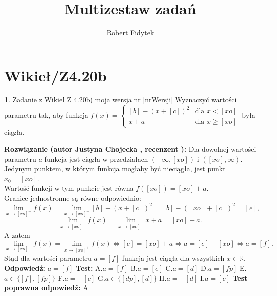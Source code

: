 \documentclass[12pt, a4paper]{article}
\title{Multizestaw zadań}
\author{Robert Fidytek}
\date{}
\theoremstyle{definition} %
\newtheorem{zad}{}
\newcommand{\kategoria}[1]{\section{#1}} %
\newcommand{\zadStart}[1]{\begin{zad}#1\newline} %
\newcommand{\zadStop}{\end{zad}}   %
\newcommand{\rozwStart}[2]{\noindent \textbf{Rozwiązanie (autor #1 , recenzent #2): }\newline} %
\newcommand{\rozwStop}{\newline}                                            %
\newcommand{\odpStart}{\noindent \textbf{Odpowiedź:}\newline}    %
\newcommand{\odpStop}{\newline}                                             %
\newcommand{\testStart}{\noindent \textbf{Test:}\newline} %
\newcommand{\testStop}{\newline} %
\newcommand{\kluczStart}{\noindent \textbf{Test poprawna odpowiedź:}\newline} %
\newcommand{\kluczStop}{\newline} %
\begin{document}
\maketitle


\kategoria{Wikieł/Z4.20b}
\zadStart{Zadanie z Wikieł Z 4.20b) moja wersja nr [nrWersji]}
Wyznaczyć wartości parametru tak, aby funkcja $
f(x) = \left\{ \begin{array}{ll}
[b]-(x+[c])^{2} & \textrm{dla $x<[xo]$}\\
x+a & \textrm{dla $x\geq [xo]$}
\end{array} \right.
$ była ciągła.
\zadStop
\rozwStart{Justyna Chojecka}{}
Dla dowolnej wartości parametru $a$ funkcja jest ciągła w przedziałach $(-\infty,[xo])$ i $([xo],\infty)$. Jedynym punktem, w którym funkcja mogłaby być nieciągła, jest punkt $x_{0}=[xo]$.\\
Wartość funkcji w tym punkcie jest równa $f([xo])=[xo]+a$.\\
Granice jednostronne są równe odpowiednio:
$$\lim\limits_{x\to [xo]^{-}}f(x)=\lim\limits_{x\to [xo]^{-}}[b]-(x+[c])^{2}=[b]-([xo]+[c])^{2}=[e],$$
$$\lim\limits_{x\to [xo]^{+}}f(x)=\lim\limits_{x\to [xo]^{+}}x+a=[xo]+a.$$
A zatem
$$\lim\limits_{x\to [xo]^{-}}f(x)=\lim\limits_{x\to [xo]^{+}}f(x)\iff [e]=[xo]+a \iff a=[e]-[xo] \iff a=[f].$$
Stąd dla wartości parametru $a=[f]$ funkcja jest ciągła dla wszystkich $x\in\mathbb{R}.$
\rozwStop
\odpStart
$a=[f]$
\odpStop
\testStart
A.$a=[f]$
B.$a=[e]$
C.$a=[d]$
D.$a=[fp]$
E.$a\in\{[f],[fp]\}$
F.$a=-[c]$
G.$a\in\{[dp],[d]\}$
H.$a=-[d]$
I.$a=[c]$
\testStop
\kluczStart
A
\kluczStop
\end{document}
